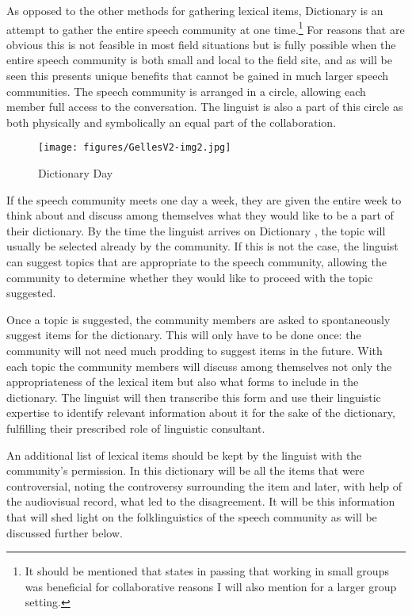\documentclass[output=paper,
modfonts
]{langscibook}
\begin{document}
As opposed to the other methods for gathering lexical items, Dictionary  is an attempt to gather the entire speech community at one time.\footnote{It should be mentioned that \citet{Bowern2008} states in passing that working in small groups was beneficial for collaborative reasons I will also mention for a larger group setting.} For reasons that are obvious this is not feasible in most field situations but is fully possible when the entire speech community is both small and local to the field site, and as will be seen this presents unique benefits that cannot be gained in much larger speech communities. The speech community is arranged in a circle, allowing each member full access to the conversation. The linguist is also a part of this circle as both physically and symbolically an equal part of the collaboration. 

  
\begin{figure}
\texttt{[image: figures/GellesV2-img2.jpg]}
\caption{Dictionary Day}
\label{fig:gelles:3}
\end{figure}

If the speech community meets one day a week, they are given the entire week to think about and discuss among themselves what they would like to be a part of their dictionary. By the time the linguist arrives on Dictionary , the topic will usually be selected already by the community. If this is not the case, the linguist can suggest topics that are appropriate to the speech community, allowing the community to determine whether they would like to proceed with the topic suggested. 

Once a topic is suggested, the community members are asked to spontaneously suggest items for the dictionary. This will only have to be done once:  the community will not need much prodding to suggest items in the future. With each topic the community members will discuss among themselves not only the appropriateness of the lexical item but also what forms to include in the dictionary. The linguist will then transcribe this form and use their linguistic expertise to identify relevant information about it for the sake of the dictionary, fulfilling their prescribed role of linguistic consultant. 

An additional list of lexical items should be kept by the linguist with the community’s permission. In this dictionary will be all the items that were controversial, noting the controversy surrounding the item and later, with help of the audiovisual record, what led to the disagreement. It will be this information that will shed light on the folklinguistics of the speech community as will be discussed further below. 
\end{document}

